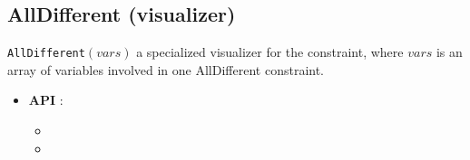 \subsection{AllDifferent (visualizer)}\label{alldiff:visu}\hypertarget{alldiff:visu}{}
\begin{notedef}
  \texttt{AllDifferent}$(vars)$ a specialized visualizer for the  constraint, where $vars$ is an array of variables involved in one AllDifferent constraint.
\end{notedef}

\begin{itemize}
	\item \textbf{API} : 
	\begin{itemize}
	\item {}
	\item {}
	\end{itemize}
\end{itemize}

%

